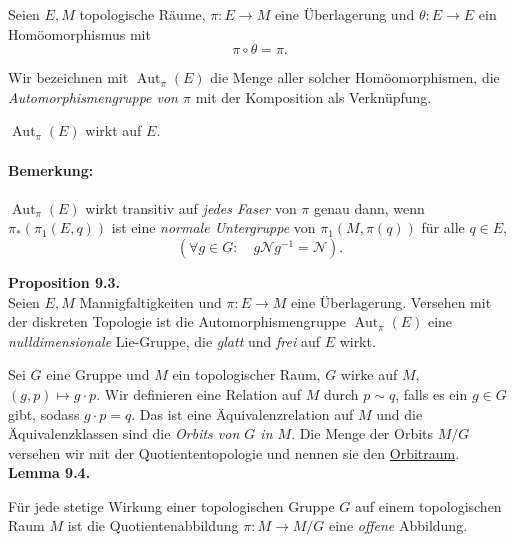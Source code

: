\documentclass[fleqn, 12pt, letterpaper]{article}
\begin{document}
Seien \(E, M\) topologische Räume, \(\pi: E \to M\) eine Überlagerung und \(\theta: E \to E\) ein Homöomorphismus mit
\[
\pi \circ \theta = \pi.
\]
\begin{center}
\end{center}

Wir bezeichnen mit \(\operatorname{Aut}_\pi(E)\) die Menge aller solcher Homöomorphismen, die \emph{Automorphismengruppe von \(\pi\)} mit der Komposition als Verknüpfung.

\(\operatorname{Aut}_\pi(E)\) wirkt auf \(E\).

\paragraph{Bemerkung:} \(\operatorname{Aut}_\pi(E)\) wirkt transitiv auf \emph{jedes Faser} von \(\pi\) genau dann, wenn \(\pi_* \left( \pi_1(E, q) \right)\) ist eine \emph{normale Untergruppe} von \(\pi_1(M, \pi(q))\) für alle \(q \in E\),
\[
\left( \forall g \in G: \quad g \mathcal{N} g^{-1} = \mathcal{N} \right).
\]

\textbf{Proposition 9.3.} \\
Seien \(E, M\) Mannigfaltigkeiten und \(\pi: E \to M\) eine Überlagerung. Versehen mit der diskreten Topologie ist die Automorphismengruppe \(\operatorname{Aut}_\pi(E)\) eine \emph{nulldimensionale} Lie-Gruppe, die \emph{glatt} und \emph{frei} auf \(E\) wirkt.
\vspace{0.8cm}

Sei \( G \) eine Gruppe und \( M \) ein topologischer Raum, \( G \) wirke auf \( M \), \( (g, p) \mapsto g \cdot p \). Wir definieren eine Relation auf \( M \) durch \( p \sim q \), falls es ein \( g \in G \) gibt, sodass \( g \cdot p = q \). Das ist eine Äquivalenzrelation auf \( M \) und die Äquivalenzklassen sind die \emph{Orbits von \( G \) in \( M \)}. Die Menge der Orbits \( M / G \) versehen wir mit der Quotiententopologie und nennen sie den \underline{Orbitraum}. \\[1em]

\textbf{Lemma 9.4.} 

Für jede stetige Wirkung einer topologischen Gruppe \( G \) auf einem topologischen Raum \( M \) ist die Quotientenabbildung \( \pi : M \to M / G \) eine \emph{offene} Abbildung.\\
\end{document}
